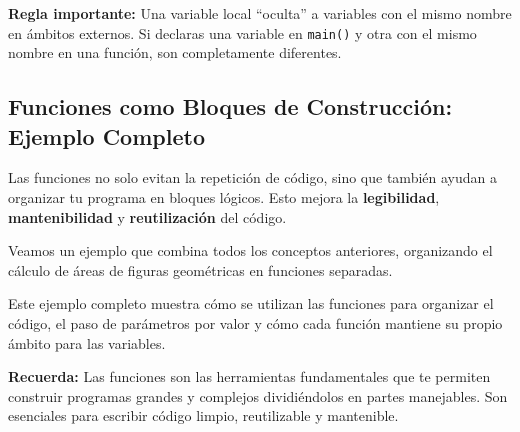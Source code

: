 

\textbf{Regla importante:} Una variable local ``oculta'' a variables con el mismo nombre en ámbitos externos. Si declaras una variable en \texttt{main()} y otra con el mismo nombre en una función, son completamente diferentes.

\subsection{Funciones como Bloques de Construcción: Ejemplo Completo}
\label{subsec:funciones_como_bloques}

Las funciones no solo evitan la repetición de código, sino que también ayudan a organizar tu programa en bloques lógicos. Esto mejora la \textbf{legibilidad}, \textbf{mantenibilidad} y \textbf{reutilización} del código.

Veamos un ejemplo que combina todos los conceptos anteriores, organizando el cálculo de áreas de figuras geométricas en funciones separadas.



Este ejemplo completo muestra cómo se utilizan las funciones para organizar el código, el paso de parámetros por valor y cómo cada función mantiene su propio ámbito para las variables.

\textbf{Recuerda:} Las funciones son las herramientas fundamentales que te permiten construir programas grandes y complejos dividiéndolos en partes manejables. Son esenciales para escribir código limpio, reutilizable y mantenible.
